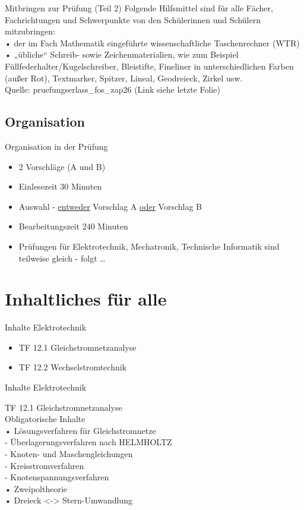 \documentclass[aspectratio=169, ignorenonframetext]{beamer}
\begin{document}
\begin{frame}{Mitbringen zur Prüfung (Teil 2)}
Folgende Hilfsmittel sind für alle Fächer, Fachrichtungen und Schwerpunkte von den Schülerinnen und Schülern mitzubringen:\\
• der im Fach Mathematik eingeführte wissenschaftliche Taschenrechner (WTR)\\
• „übliche“ Schreib- sowie Zeichenmaterialien, wie zum Beispiel
Füllfederhalter/Kugelschreiber, Bleistifte, Fineliner in unterschiedlichen Farben (außer
Rot), Textmarker, Spitzer, Lineal, Geodreieck, Zirkel usw.\\[\baselineskip] Quelle: pruefungserlass\_fos\_zap26 (Link siehe letzte Folie)
\end{frame}

\subsection{Organisation}
\begin{frame}{Organisation in der Prüfung}
    \begin{itemize}
      \item 2 Vorschläge (A und B)
    \item Einlesezeit 30 Minuten
    \item Auswahl - \underline{entweder} Vorschlag A \underline{oder} Vorschlag B
    \item Bearbeitungszeit 240 Minuten
    \item Prüfungen für Elektrotechnik, Mechatronik, Technische Informatik sind teilweise gleich - folgt \dots
   \end{itemize}
\end{frame}
\section{Inhaltliches für alle}
  \begin{frame}{Inhalte Elektrotechnik}
   \begin{itemize}
    \item TF 12.1 Gleichstromnetzanalyse\\
    \item TF 12.2 Wechselstromtechnik
   \end{itemize}
  \end{frame}

  \begin{frame}{Inhalte Elektrotechnik}
    \subtitle{TF 12.1 - Gleichstromnetzanalyse}
 TF 12.1 Gleichstromnetzanalyse\\
Obligatorische Inhalte\\
• Lösungsverfahren für Gleichstromnetze\\
- Überlagerungsverfahren nach HELMHOLTZ\\
- Knoten- und Maschengleichungen\\
- Kreisstromverfahren\\
- Knotenspannungsverfahren\\
• Zweipoltheorie\\
• Dreieck <-> Stern-Umwandlung
  \end{frame}
\end{document}
